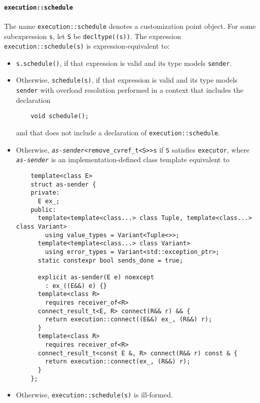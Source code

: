 \documentclass[a4paper,12pt,notitlepage,twoside,openright]{article}
\begin{document}
\hypertarget{executionschedule}{%
\paragraph{\texorpdfstring{\texttt{execution::schedule}}{}}\label{executionschedule}}

The name \texttt{execution::schedule} denotes a
customization point object. For some subexpression
\texttt{s}, let \texttt{S} be
\texttt{decltype((s))}. The expression
\texttt{execution::schedule(s)} is expression-equivalent to:

\begin{itemize}
\item
  \texttt{s.schedule()}, if that expression is valid and its
  type models \texttt{sender}.
\item
  Otherwise, \texttt{schedule(s)}, if that expression is
  valid and its type models \texttt{sender} with overload
  resolution performed in a context that includes the declaration

  \begin{verbatim}
    void schedule();
  \end{verbatim}

  and that does not include a declaration of
  \texttt{execution::schedule}.
\item
  Otherwise,
  \emph{\texttt{as-sender}}\texttt{<remove_cvref_t<S>>{s}}
  if \texttt{S} satisfies \texttt{executor},
  where \emph{\texttt{as-sender}} is an
  implementation-defined class template equivalent to

  \begin{verbatim}
    template<class E>
    struct as-sender {
    private:
      E ex_;
    public:
      template<template<class...> class Tuple, template<class...> class Variant>
        using value_types = Variant<Tuple<>>;
      template<template<class...> class Variant>
        using error_types = Variant<std::exception_ptr>;
      static constexpr bool sends_done = true;

      explicit as-sender(E e) noexcept
        : ex_((E&&) e) {}
      template<class R>
        requires receiver_of<R>
      connect_result_t<E, R> connect(R&& r) && {
        return execution::connect((E&&) ex_, (R&&) r);
      }
      template<class R>
        requires receiver_of<R>
      connect_result_t<const E &, R> connect(R&& r) const & {
        return execution::connect(ex_, (R&&) r);
      }
    };
  \end{verbatim}
\item
  Otherwise, \texttt{execution::schedule(s)} is ill-formed.
\end{itemize}
\end{document}
